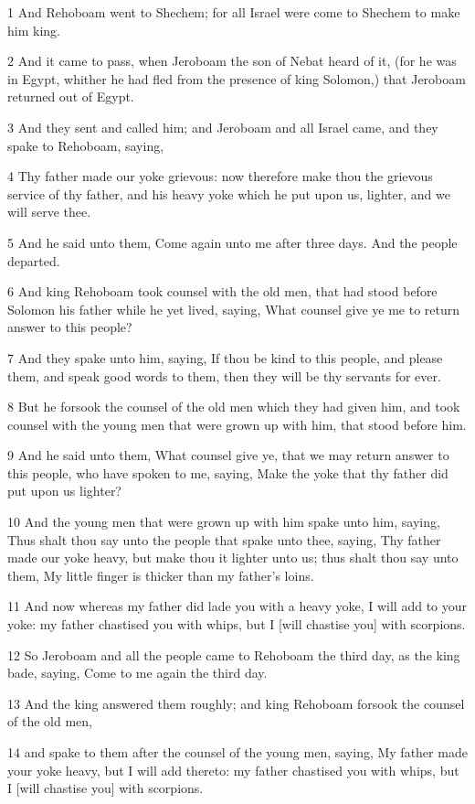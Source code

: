 \par 1 And Rehoboam went to Shechem; for all Israel were come to Shechem to make him king.
\par 2 And it came to pass, when Jeroboam the son of Nebat heard of it, (for he was in Egypt, whither he had fled from the presence of king Solomon,) that Jeroboam returned out of Egypt.
\par 3 And they sent and called him; and Jeroboam and all Israel came, and they spake to Rehoboam, saying,
\par 4 Thy father made our yoke grievous: now therefore make thou the grievous service of thy father, and his heavy yoke which he put upon us, lighter, and we will serve thee.
\par 5 And he said unto them, Come again unto me after three days. And the people departed.
\par 6 And king Rehoboam took counsel with the old men, that had stood before Solomon his father while he yet lived, saying, What counsel give ye me to return answer to this people?
\par 7 And they spake unto him, saying, If thou be kind to this people, and please them, and speak good words to them, then they will be thy servants for ever.
\par 8 But he forsook the counsel of the old men which they had given him, and took counsel with the young men that were grown up with him, that stood before him.
\par 9 And he said unto them, What counsel give ye, that we may return answer to this people, who have spoken to me, saying, Make the yoke that thy father did put upon us lighter?
\par 10 And the young men that were grown up with him spake unto him, saying, Thus shalt thou say unto the people that spake unto thee, saying, Thy father made our yoke heavy, but make thou it lighter unto us; thus shalt thou say unto them, My little finger is thicker than my father's loins.
\par 11 And now whereas my father did lade you with a heavy yoke, I will add to your yoke: my father chastised you with whips, but I [will chastise you] with scorpions.
\par 12 So Jeroboam and all the people came to Rehoboam the third day, as the king bade, saying, Come to me again the third day.
\par 13 And the king answered them roughly; and king Rehoboam forsook the counsel of the old men,
\par 14 and spake to them after the counsel of the young men, saying, My father made your yoke heavy, but I will add thereto: my father chastised you with whips, but I [will chastise you] with scorpions.
